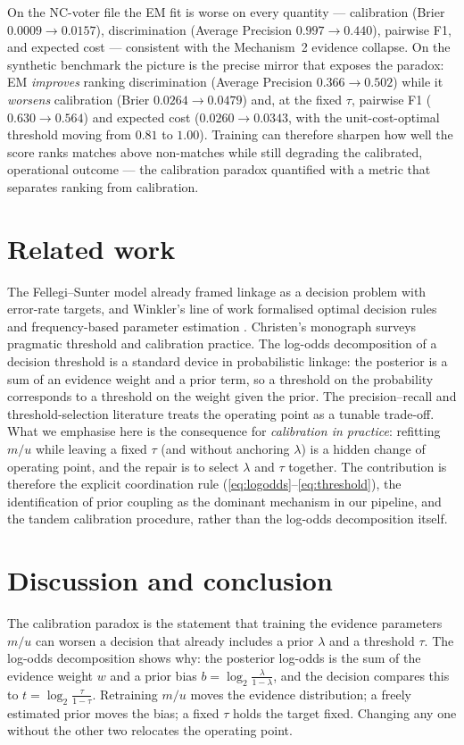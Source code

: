 \documentclass[11pt]{article}
\begin{document}
On the NC-voter file the EM fit is worse on every quantity --- calibration (Brier
$0.0009\to0.0157$), discrimination (Average Precision $0.997\to0.440$), pairwise F1, and
expected cost --- consistent with the Mechanism~2 evidence collapse. On the synthetic
benchmark the picture is the precise mirror that exposes the paradox: EM \emph{improves}
ranking discrimination (Average Precision $0.366\to0.502$) while it \emph{worsens}
calibration (Brier $0.0264\to0.0479$) and, at the fixed $\tau$, pairwise F1
($0.630\to0.564$) and expected cost ($0.0260\to0.0343$, with the unit-cost-optimal threshold
moving from $0.81$ to $1.00$). Training can therefore sharpen how well the score ranks
matches above non-matches while still degrading the calibrated, operational outcome --- the
calibration paradox quantified with a metric that separates ranking from calibration.

\section{Related work}
The Fellegi--Sunter model \cite{fellegi1969} already framed linkage as a decision problem
with error-rate targets, and Winkler's line of work formalised optimal decision rules and
frequency-based parameter estimation \cite{winkler1993,winkler2000}. Christen's monograph
\cite{christen2012} surveys pragmatic threshold and calibration practice. The
log-odds decomposition of a decision threshold is a standard device in probabilistic
linkage: the posterior is a sum of an evidence weight and a prior term, so a threshold on
the probability corresponds to a threshold on the weight given the prior. The
precision--recall and threshold-selection literature \cite{davis2006} treats the operating
point as a tunable trade-off. What we emphasise here is the consequence for
\emph{calibration in practice}: refitting $m/u$ while leaving a fixed $\tau$ (and without
anchoring $\lambda$) is a hidden change of operating point, and the repair is to select
$\lambda$ and $\tau$ together. The contribution is therefore the explicit coordination rule
(\eqref{eq:logodds}--\eqref{eq:threshold}), the identification of prior coupling as the
dominant mechanism in our pipeline, and the tandem calibration procedure, rather than the
log-odds decomposition itself.

\section{Discussion and conclusion}
The calibration paradox is the statement that training the evidence parameters $m/u$ can
worsen a decision that already includes a prior $\lambda$ and a threshold $\tau$. The
log-odds decomposition shows why: the posterior log-odds is the sum of the evidence weight
$w$ and a prior bias $b=\log_2\frac{\lambda}{1-\lambda}$, and the decision compares this to
$t=\log_2\frac{\tau}{1-\tau}$. Retraining $m/u$ moves the evidence distribution; a freely
estimated prior moves the bias; a fixed $\tau$ holds the target fixed. Changing any one
without the other two relocates the operating point.
\end{document}
